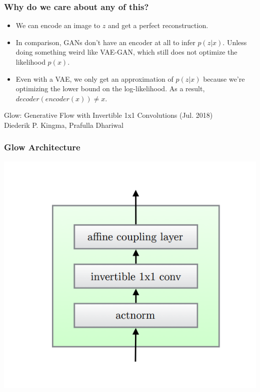 \documentclass{beamer}
\begin{document}
\begin{frame}
  \frametitle{Why do we care about any of this?}

  \begin{itemize}
    \item We can encode an image to $z$ and get a perfect reconstruction.

    \item In comparison, GANs don't have an encoder at all to infer $p(z | x)$.
      Unless doing something weird like VAE-GAN, which still does not optimize
      the likelihood $p(x)$.

    \item Even with a VAE, we only get an approximation of $p(z | x)$ because we're optimizing
      the lower bound on the log-likelihood. As a result, $decoder(encoder(x)) \neq x$.
  \end{itemize}
\end{frame}

\begin{frame}
  \begin{center}
    {\huge Glow: Generative Flow with Invertible 1x1 Convolutions (Jul. 2018)}
    \\
    {Diederik P. Kingma, Prafulla Dhariwal}
\end{center}
\end{frame}


\begin{frame}
  \frametitle{Glow Architecture}

  \includegraphics[width=1.0\textwidth]{glow-single-block.png}
\end{frame}
\end{document}
